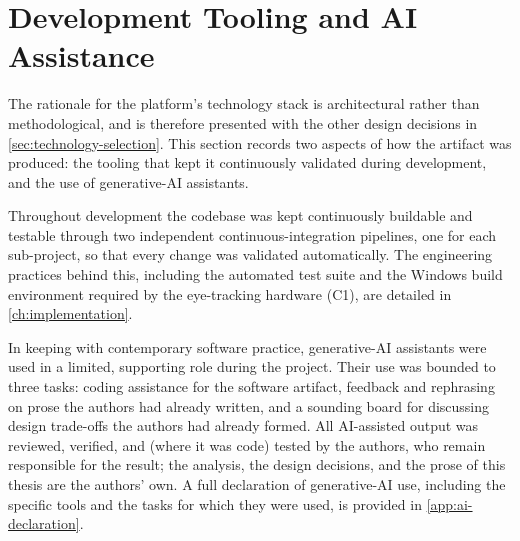 \section{Development Tooling and AI Assistance}
\label{sec:tools-and-technologies}

The rationale for the platform's technology stack is architectural rather than methodological, and is therefore presented with the other design decisions in \cref{sec:technology-selection}.
This section records two aspects of how the artifact was produced: the tooling that kept it continuously validated during development, and the use of generative-AI assistants.

Throughout development the codebase was kept continuously buildable and testable through two independent continuous-integration pipelines, one for each sub-project, so that every change was validated automatically.
The engineering practices behind this, including the automated test suite and the Windows build environment required by the eye-tracking hardware (C1), are detailed in \cref{ch:implementation}.

In keeping with contemporary software practice, generative-AI assistants were used in a limited, supporting role during the project.
Their use was bounded to three tasks: coding assistance for the software artifact, feedback and rephrasing on prose the authors had already written, and a sounding board for discussing design trade-offs the authors had already formed.
All AI-assisted output was reviewed, verified, and (where it was code) tested by the authors, who remain responsible for the result; the analysis, the design decisions, and the prose of this thesis are the authors' own.
A full declaration of generative-AI use, including the specific tools and the tasks for which they were used, is provided in \cref{app:ai-declaration}.
